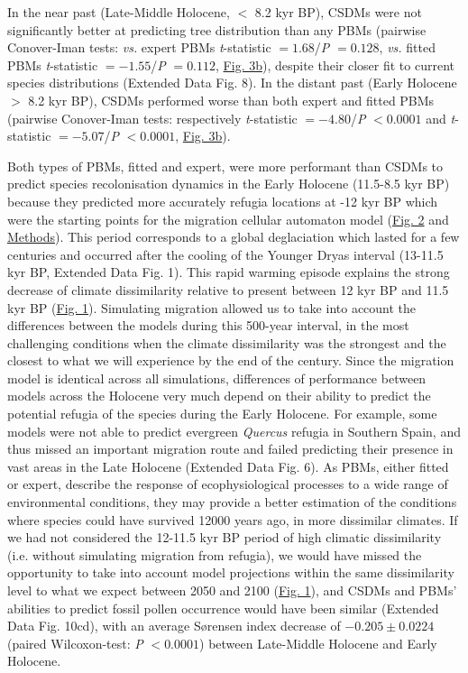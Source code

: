 \documentclass[pdflatex, sn-nature]{sn-jnl}%
\newcommand{\textappr}{\raisebox{0.5ex}{\texttildelow}} %
\begin{document}
In the near past (Late-Middle Holocene, $<$ 8.2 kyr BP), CSDMs were not significantly better at predicting tree distribution than any PBMs (pairwise Conover-Iman tests: \emph{vs.} expert PBMs \emph{t}-statistic $=1.68$/\emph{P} $=0.128$, \emph{vs.} fitted PBMs \emph{t}-statistic $=-1.55$/\emph{P} $=0.112$, \hyperref[past_performance]{Fig. 3b}), despite their closer fit to current species distributions (Extended Data Fig. 8). In the distant past (Early Holocene $>$ 8.2 kyr BP), CSDMs performed worse than both expert and fitted PBMs (pairwise Conover-Iman tests: respectively \emph{t}-statistic $=-4.80$/\emph{P} $<0.0001$ and \emph{t}-statistic $=-5.07$/\emph{P} $<0.0001$, \hyperref[past_performance]{Fig. 3b}). 

Both types of PBMs, fitted and expert, were more performant than CSDMs to predict species recolonisation dynamics in the Early Holocene (\textappr11.5-8.5 kyr BP)  because they predicted more accurately refugia locations at -12 kyr BP which were the starting points for the migration cellular automaton model (\hyperref[quercus_migration]{Fig. 2} and \hyperref[methods]{Methods}). This period  corresponds to a global deglaciation which lasted for a few centuries and occurred after the cooling of the Younger Dryas interval  (\textappr13-11.5 kyr BP, Extended Data Fig. 1). This rapid warming episode explains the strong decrease of climate dissimilarity relative to present between 12 kyr BP and 11.5 kyr BP (\hyperref[climatic_dissimilarity]{Fig. 1}). Simulating migration allowed us to take into account the differences between the models during this 500-year interval, in the most challenging conditions when the climate dissimilarity was the strongest and the closest to what we will experience by the end of the century. Since the migration model is identical across all simulations, differences of performance between models across the Holocene very much depend on their ability to predict the potential refugia of the species during the Early Holocene. For example, some models were not able to predict evergreen \emph{Quercus} refugia in Southern Spain, and thus missed an important migration route and failed predicting their presence in vast areas in the Late Holocene (Extended Data Fig. 6). As PBMs, either fitted or expert, describe the response of ecophysiological processes to a wide range of environmental conditions, they may provide a better estimation of the conditions where species could have survived 12000 years ago, in more dissimilar climates. If we had not considered the 12-11.5 kyr BP period of high climatic dissimilarity (i.e. without simulating migration from refugia), we would have missed the opportunity to take into account model projections within the same dissimilarity level to what we expect between 2050 and 2100 (\hyperref[climatic_dissimilarity]{Fig. 1}), and CSDMs and PBMs' abilities to predict fossil pollen occurrence would have been similar (Extended Data Fig. 10cd), with an average Sørensen index decrease of $-0.205\pm0.0224$ (paired Wilcoxon-test: \emph{P} $<0.0001$) between Late-Middle Holocene and Early Holocene.
\end{document}
